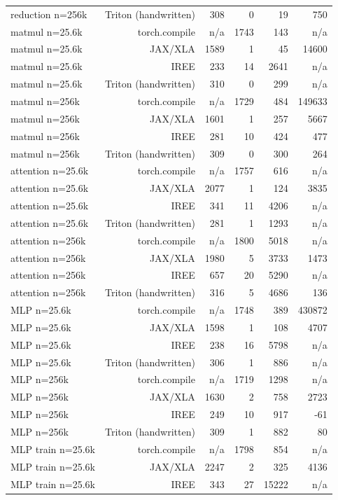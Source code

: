 \begin{tabular}{lrrrrr}
reduction n=256k & Triton (handwritten) & 308 & 0 & 19 & 750 \\
matmul n=25.6k & torch.compile & n/a & 1743 & 143 & n/a \\
matmul n=25.6k & JAX/XLA & 1589 & 1 & 45 & 14600 \\
matmul n=25.6k & IREE & 233 & 14 & 2641 & n/a \\
matmul n=25.6k & Triton (handwritten) & 310 & 0 & 299 & n/a \\
matmul n=256k & torch.compile & n/a & 1729 & 484 & 149633 \\
matmul n=256k & JAX/XLA & 1601 & 1 & 257 & 5667 \\
matmul n=256k & IREE & 281 & 10 & 424 & 477 \\
matmul n=256k & Triton (handwritten) & 309 & 0 & 300 & 264 \\
attention n=25.6k & torch.compile & n/a & 1757 & 616 & n/a \\
attention n=25.6k & JAX/XLA & 2077 & 1 & 124 & 3835 \\
attention n=25.6k & IREE & 341 & 11 & 4206 & n/a \\
attention n=25.6k & Triton (handwritten) & 281 & 1 & 1293 & n/a \\
attention n=256k & torch.compile & n/a & 1800 & 5018 & n/a \\
attention n=256k & JAX/XLA & 1980 & 5 & 3733 & 1473 \\
attention n=256k & IREE & 657 & 20 & 5290 & n/a \\
attention n=256k & Triton (handwritten) & 316 & 5 & 4686 & 136 \\
MLP n=25.6k & torch.compile & n/a & 1748 & 389 & 430872 \\
MLP n=25.6k & JAX/XLA & 1598 & 1 & 108 & 4707 \\
MLP n=25.6k & IREE & 238 & 16 & 5798 & n/a \\
MLP n=25.6k & Triton (handwritten) & 306 & 1 & 886 & n/a \\
MLP n=256k & torch.compile & n/a & 1719 & 1298 & n/a \\
MLP n=256k & JAX/XLA & 1630 & 2 & 758 & 2723 \\
MLP n=256k & IREE & 249 & 10 & 917 & -61 \\
MLP n=256k & Triton (handwritten) & 309 & 1 & 882 & 80 \\
MLP train n=25.6k & torch.compile & n/a & 1798 & 854 & n/a \\
MLP train n=25.6k & JAX/XLA & 2247 & 2 & 325 & 4136 \\
MLP train n=25.6k & IREE & 343 & 27 & 15222 & n/a \\

\end{tabular}
